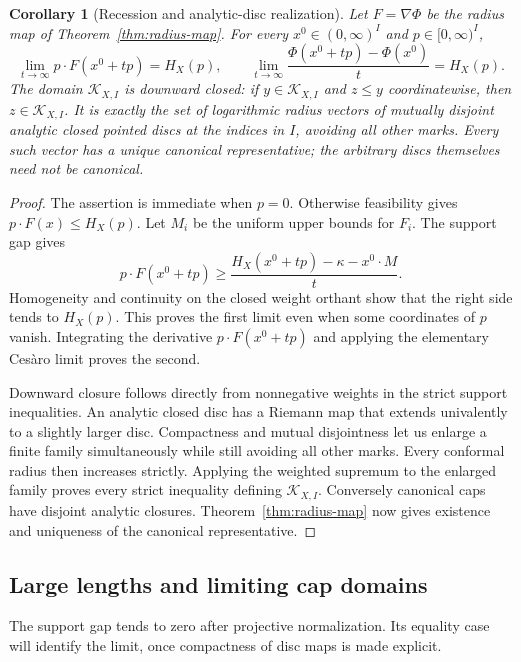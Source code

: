 \documentclass[11pt,a4paper]{article}
\newtheorem{corollary}[theorem]{Corollary}
\theoremstyle{definition}
\begin{document}
\begin{corollary}[Recession and analytic-disc realization]\label{cor:radius-recession}
Let $F=\nabla\Phi$ be the radius map of Theorem~\ref{thm:radius-map}. For every $x^0\in(0,\infty)^I$ and $p\in[0,\infty)^I$,
\[
 \lim_{t\to\infty}p\cdot F(x^0+tp)=H_X(p),\qquad
 \lim_{t\to\infty}\frac{\Phi(x^0+tp)-\Phi(x^0)}t=H_X(p).
\]
The domain $\mathcal K_{X,I}$ is downward closed: if $y\in\mathcal K_{X,I}$ and $z\le y$ coordinatewise, then $z\in\mathcal K_{X,I}$. It is exactly the set of logarithmic radius vectors of mutually disjoint analytic closed pointed discs at the indices in $I$, avoiding all other marks. Every such vector has a unique canonical representative; the arbitrary discs themselves need not be canonical.
\end{corollary}
\begin{proof}
The assertion is immediate when $p=0$. Otherwise feasibility gives $p\cdot F(x)\le H_X(p)$. Let $M_i$ be the uniform upper bounds for $F_i$. The support gap gives
\[
 p\cdot F(x^0+tp)\ge
 \frac{H_X(x^0+tp)-\kappa-x^0\cdot M}{t}.
\]
Homogeneity and continuity on the closed weight orthant show that the right side tends to $H_X(p)$. This proves the first limit even when some coordinates of $p$ vanish. Integrating the derivative $p\cdot F(x^0+tp)$ and applying the elementary Ces\`aro limit proves the second.

Downward closure follows directly from nonnegative weights in the strict support inequalities. An analytic closed disc has a Riemann map that extends univalently to a slightly larger disc. Compactness and mutual disjointness let us enlarge a finite family simultaneously while still avoiding all other marks. Every conformal radius then increases strictly. Applying the weighted supremum to the enlarged family proves every strict inequality defining $\mathcal K_{X,I}$. Conversely canonical caps have disjoint analytic closures. Theorem~\ref{thm:radius-map} now gives existence and uniqueness of the canonical representative.
\end{proof}

\subsection{Large lengths and limiting cap domains}
The support gap tends to zero after projective normalization. Its equality case will identify the limit, once compactness of disc maps is made explicit.
\end{document}
